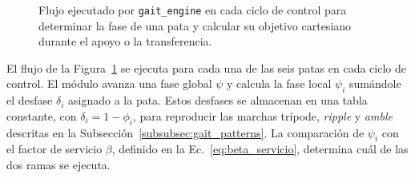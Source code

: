 \begin{figure}[H]
{}
    \captionsetup{justification=centering,singlelinecheck=false}
    \caption[Actualización de cada pata en \texttt{gait\_engine}]
    {Flujo ejecutado por \texttt{gait\_engine} en cada ciclo de control para
    determinar la fase de una pata y calcular su objetivo cartesiano durante el
    apoyo o la transferencia.}
    \label{fig:arquitectura_gait_engine}
\end{figure}
\vspace{-1\baselineskip}

El flujo de la Figura~\ref{fig:arquitectura_gait_engine} se ejecuta para cada
una de las seis patas en cada ciclo de control. El módulo avanza una fase global
$\psi$ y calcula la fase local $\psi_i$ sumándole el desfase $\delta_i$
asignado a la pata. Estos desfases se almacenan en una tabla constante, con
$\delta_i=1-\phi_i$, para reproducir las marchas trípode, \textit{ripple} y
\textit{amble} descritas en la Subsección~\ref{subsubsec:gait_patterns}. La
comparación de $\psi_i$ con el factor de servicio $\beta$, definido en la
Ec.~\ref{eq:beta_servicio}, determina cuál de las dos ramas se ejecuta.

